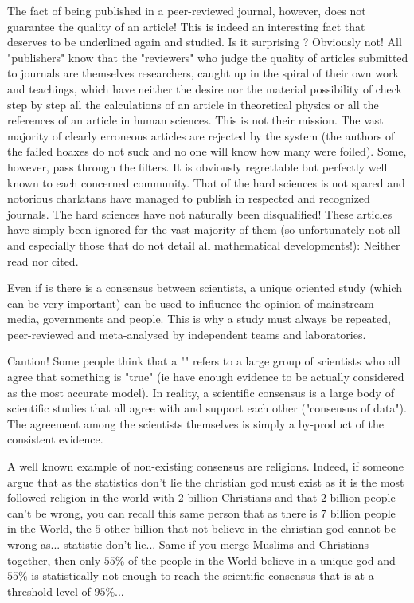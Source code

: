 	The fact of being published in a peer-reviewed journal, however, does not guarantee the quality of an article! This is indeed an interesting fact that deserves to be underlined again and studied. Is it surprising ? Obviously not! All "publishers" know that the "reviewers" who judge the quality of articles submitted to journals are themselves researchers, caught up in the spiral of their own work and teachings, which have neither the desire nor the material possibility of check step by step all the calculations of an article in theoretical physics or all the references of an article in human sciences. This is not their mission. The vast majority of clearly erroneous articles are rejected by the system (the authors of the failed hoaxes do not suck and no one will know how many were foiled). Some, however, pass through the filters. It is obviously regrettable but perfectly well known to each concerned community. That of the hard sciences is not spared and notorious charlatans have managed to publish in respected and recognized journals. The hard sciences have not naturally been disqualified! These articles have simply been ignored for the vast majority of them (so unfortunately not all and especially those that do not detail all mathematical developments!): Neither read nor cited.
	
	\begin{tcolorbox}[title=Remark,colframe=black,arc=10pt]
	Even if is there is a consensus between scientists, a unique oriented study (which can be very important) can be used to influence the opinion of mainstream media, governments and people. This is why a study must always be repeated, peer-reviewed and meta-analysed by independent teams and laboratories.
	\end{tcolorbox}
	
	\begin{tcolorbox}[colback=red!5,borderline={1mm}{2mm}{red!5},arc=0mm,boxrule=0pt]
	\bcbombe Caution! Some people think that a "" refers to a large group of scientists who all agree that something is "true" (ie have enough evidence to be actually considered as the most accurate model). In reality, a scientific consensus is a large body of scientific studies that all agree with and support each other ("consensus of data"). The agreement among the scientists themselves is simply a by-product of the consistent evidence.
	\end{tcolorbox}
	
	A well known example of non-existing consensus are religions. Indeed, if someone argue that as the statistics don't lie the christian god must exist as it is the most followed religion in the world with $2$ billion Christians and that $2$ billion people can't be wrong, you can recall this same person that as there is $7$ billion people in the World, the $5$ other billion that not believe in the christian god cannot be wrong as... statistic don't lie... Same if you merge Muslims and Christians together, then only $55\%$ of the people in the World believe in a unique god and $55\%$ is statistically not enough to reach the scientific consensus that is at a threshold level of $95\%$...
	
